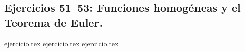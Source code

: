 \subsection*{Ejercicios 51--53: Funciones homogéneas y el Teorema de Euler.}
\begin{enumerate}
    \setcounter{enumi}{50}
    {ejercicio.tex}
    {ejercicio.tex}
    {ejercicio.tex}
\end{enumerate}
